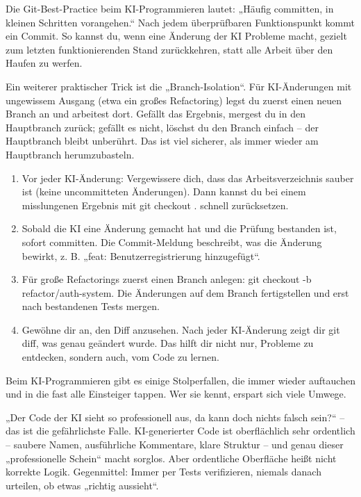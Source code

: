 Die Git-Best-Practice beim KI-Programmieren lautet: „Häufig committen, in kleinen Schritten vorangehen.“ Nach jedem überprüfbaren Funktionspunkt kommt ein Commit. So kannst du, wenn eine Änderung der KI Probleme macht, gezielt zum letzten funktionierenden Stand zurückkehren, statt alle Arbeit über den Haufen zu werfen.

Ein weiterer praktischer Trick ist die „Branch-Isolation“. Für KI-Änderungen mit ungewissem Ausgang (etwa ein großes Refactoring) legst du zuerst einen neuen Branch an und arbeitest dort. Gefällt das Ergebnis, mergest du in den Hauptbranch zurück; gefällt es nicht, löschst du den Branch einfach – der Hauptbranch bleibt unberührt. Das ist viel sicherer, als immer wieder am Hauptbranch herumzubasteln.

\begin{enumerate}
  \item Vor jeder KI-Änderung: Vergewissere dich, dass das Arbeitsverzeichnis sauber ist (keine uncommitteten Änderungen). Dann kannst du bei einem misslungenen Ergebnis mit git checkout . schnell zurücksetzen.
  \item Sobald die KI eine Änderung gemacht hat und die Prüfung bestanden ist, sofort committen. Die Commit-Meldung beschreibt, was die Änderung bewirkt, z. B. „feat: Benutzerregistrierung hinzugefügt“.
  \item Für große Refactorings zuerst einen Branch anlegen: git checkout -b refactor/auth-system. Die Änderungen auf dem Branch fertigstellen und erst nach bestandenen Tests mergen.
  \item Gewöhne dir an, den Diff anzusehen. Nach jeder KI-Änderung zeigt dir git diff, was genau geändert wurde. Das hilft dir nicht nur, Probleme zu entdecken, sondern auch, vom Code zu lernen.
\end{enumerate}


Beim KI-Programmieren gibt es einige Stolperfallen, die immer wieder auftauchen und in die fast alle Einsteiger tappen. Wer sie kennt, erspart sich viele Umwege.


„Der Code der KI sieht so professionell aus, da kann doch nichts falsch sein?“ – das ist die gefährlichste Falle. KI-generierter Code ist oberflächlich sehr ordentlich – saubere Namen, ausführliche Kommentare, klare Struktur – und genau dieser „professionelle Schein“ macht sorglos. Aber ordentliche Oberfläche heißt nicht korrekte Logik. Gegenmittel: Immer per Tests verifizieren, niemals danach urteilen, ob etwas „richtig aussieht“.

